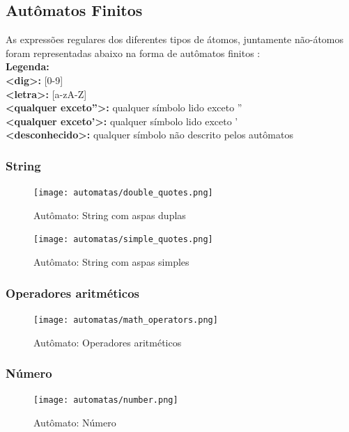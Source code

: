 \subsection{Autômatos Finitos}

As expressões regulares dos diferentes tipos de átomos, juntamente não-átomos foram representadas abaixo na forma de autômatos finitos :\\

\textbf{Legenda:}\\
\textbf{<dig>:} [0-9]\\
\textbf{<letra>:} [a-zA-Z]\\
\textbf{<qualquer exceto''>:} qualquer símbolo lido exceto ''\\
\textbf{<qualquer exceto'>:} qualquer símbolo lido exceto '\\
\textbf{<desconhecido>:} qualquer símbolo não descrito pelos autômatos\\

\subsubsection{String}
\begin{figure}[H]
\texttt{[image: automatas/double\_quotes.png]}
\caption{\label{fig:double_quotes} Autômato: String com aspas duplas}
\end{figure}

\begin{figure}[H]
\texttt{[image: automatas/simple\_quotes.png]}
\caption{\label{fig:simple_quotes} Autômato: String com aspas simples}
\end{figure}

\subsubsection{Operadores aritméticos}
\begin{figure}[H]
\texttt{[image: automatas/math\_operators.png]}
\caption{\label{fig:math_operators} Autômato: Operadores aritméticos}
\end{figure}

\subsubsection{Número}
\begin{figure}[H]
\texttt{[image: automatas/number.png]}
\caption{\label{fig:number} Autômato: Número}
\end{figure}

